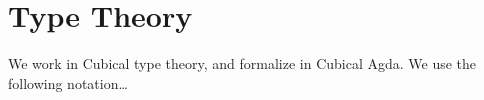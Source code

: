 \section{Type Theory}
\label{sec:type-theory}

We work in Cubical type theory, and formalize in Cubical Agda. We use the following notation\ldots{}